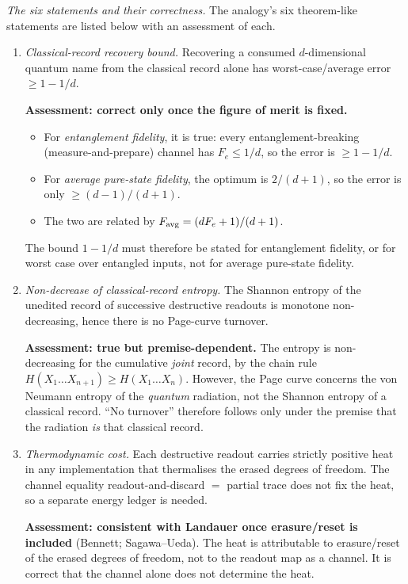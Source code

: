 \documentclass[11pt]{article}
\theoremstyle{definition}
\begin{document}
\emph{The six statements and their correctness.} The analogy's six theorem-like statements are listed below with an assessment of each.
\begin{enumerate}
\item \emph{Classical-record recovery bound.} Recovering a consumed $d$-dimensional quantum name from the classical record alone has worst-case/average error $\ge1-1/d$.

\textbf{Assessment: correct only once the figure of merit is fixed.}
\begin{itemize}
\item For \emph{entanglement fidelity}, it is true: every entanglement-breaking (measure-and-prepare) channel has $F_e\le1/d$, so the error is $\ge1-1/d$.
\item For \emph{average pure-state fidelity}, the optimum is $2/(d+1)$, so the error is only $\ge(d-1)/(d+1)$.
\item The two are related by $F_{\rm avg}=(dF_e+1)/(d+1)$.
\end{itemize}
The bound $1-1/d$ must therefore be stated for entanglement fidelity, or for worst case over entangled inputs, not for average pure-state fidelity.

\item \emph{Non-decrease of classical-record entropy.} The Shannon entropy of the unedited record of successive destructive readouts is monotone non-decreasing, hence there is no Page-curve turnover.

\textbf{Assessment: true but premise-dependent.} The entropy is non-decreasing for the cumulative \emph{joint} record, by the chain rule $H(X_1\dots X_{n+1})\ge H(X_1\dots X_n)$. However, the Page curve concerns the von Neumann entropy of the \emph{quantum} radiation, not the Shannon entropy of a classical record. ``No turnover'' therefore follows only under the premise that the radiation \emph{is} that classical record.

\item \emph{Thermodynamic cost.} Each destructive readout carries strictly positive heat in any implementation that thermalises the erased degrees of freedom. The channel equality readout-and-discard $=$ partial trace does not fix the heat, so a separate energy ledger is needed.

\textbf{Assessment: consistent with Landauer once erasure/reset is included} (Bennett; Sagawa--Ueda). The heat is attributable to erasure/reset of the erased degrees of freedom, not to the readout map as a channel. It is correct that the channel alone does not determine the heat.


\end{enumerate}
\end{document}
